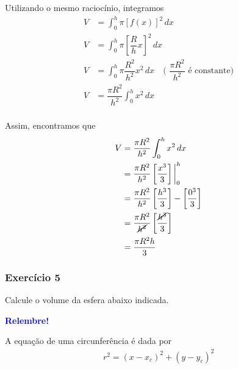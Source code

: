 \documentclass[12pt,openright,twoside,a4paper]{article}
\theoremstyle{definition}
\begin{document}
		Utilizando o mesmo raciocínio, integramos
		\begin{align*}
			V &= \int_{0}^{h} \pi [f(x)]^2 \, dx\\
			V &= \int_{0}^{h} \pi \left[\dfrac{R}{h}x\right]^2 \, dx\\
			V &= \int_{0}^{h} \pi \dfrac{R^2}{h^2}x^2 \, dx \quad \text{( $\dfrac{\pi R^2}{h^2}$ é constante)}\\
			V &= \dfrac{\pi R^2}{h^2} \int_{0}^{h} x^2 \, dx\\
		\end{align*}
		
		Assim, encontramos que
		\begin{align*}
			V &= \dfrac{\pi R^2}{h^2} \int_{0}^{h} x^2 \, dx\\
			&= \dfrac{\pi R^2}{h^2} \left[\dfrac{x^3}{3}\right]\bigg|_0^h\\
			&= \dfrac{\pi R^2}{h^2} \left[\dfrac{h^3}{3}\right] - \left[\dfrac{0^3}{3}\right]\\
			&= \dfrac{\pi R^2}{\cancel{h^2}} \left[\dfrac{\cancel{h^3}}{3}\right]\\
			&= \dfrac{\pi R^2 h}{3}
		\end{align*}
	
	\subsubsection{Exercício 5}
	
	Calcule o volume da esfera abaixo indicada.
		\begin{snugshade}
			\textbf{\textcolor{blue}{Relembre!}}
			
			A equação de uma circunferência é dada por
			\begin{align*}
				r^2 = (x-x_c)^2 + (y - y_c)^2
			\end{align*}
		\end{snugshade}
		
\end{document}
